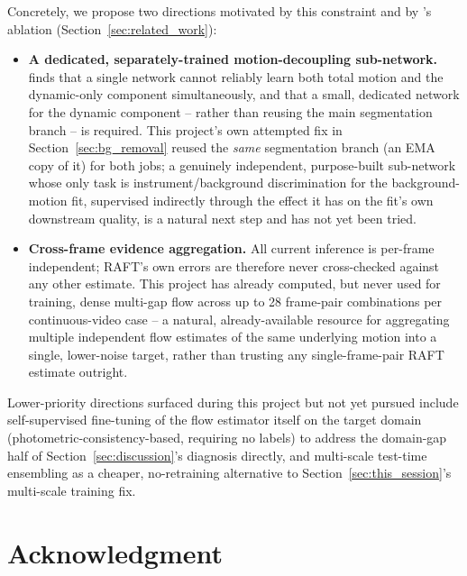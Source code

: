 \documentclass[conference]{IEEEtran}
\begin{document}
Concretely, we propose two directions motivated by this constraint and by
\cite{batrack2025}'s ablation (Section~\ref{sec:related_work}):

\begin{itemize}
\item \textbf{A dedicated, separately-trained motion-decoupling
sub-network.} \cite{batrack2025} finds that a single network cannot
reliably learn both total motion and the dynamic-only component
simultaneously, and that a small, dedicated network for the dynamic
component -- rather than reusing the main segmentation branch -- is
required. This project's own attempted fix in Section~\ref{sec:bg_removal}
reused the \emph{same} segmentation branch (an EMA copy of it) for both
jobs; a genuinely independent, purpose-built sub-network whose only task
is instrument/background discrimination for the background-motion fit,
supervised indirectly through the effect it has on the fit's own
downstream quality, is a natural next step and has not yet been tried.
\item \textbf{Cross-frame evidence aggregation.} All current inference is
per-frame independent; RAFT's own errors are therefore never
cross-checked against any other estimate. This project has already
computed, but never used for training, dense multi-gap flow across up to
28 frame-pair combinations per continuous-video case -- a natural,
already-available resource for aggregating multiple independent flow
estimates of the same underlying motion into a single, lower-noise
target, rather than trusting any single-frame-pair RAFT estimate
outright.
\end{itemize}

Lower-priority directions surfaced during this project but not yet
pursued include self-supervised fine-tuning of the flow estimator itself
on the target domain (photometric-consistency-based, requiring no labels)
to address the domain-gap half of Section~\ref{sec:discussion}'s
diagnosis directly, and multi-scale test-time ensembling as a cheaper,
no-retraining alternative to Section~\ref{sec:this_session}'s multi-scale
training fix.

\section*{Acknowledgment}



\end{document}
